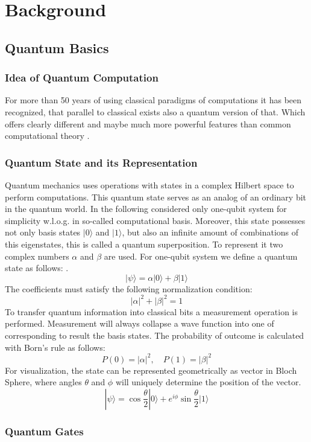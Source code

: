 
\chapter{Background}\label{chapter:background}
\section{Quantum Basics}
\subsection{Idea of Quantum Computation}
For more than 50 years of using classical paradigms of computations it has been recognized, 
that parallel to classical exists also a quantum version of that.
Which offers clearly different and maybe much more powerful features than common computational theory
\parencite{Barenco_1995}.

\subsection{Quantum State and its Representation}
Quantum mechanics uses operations with states in a complex Hilbert space to perform computations.
This quantum state serves as an analog of an ordinary bit in the quantum world.
In the following considered only one-qubit system for simplicity w.l.o.g. in so-called computational basis.
Moreover, this state possesses not only basis states \(|0\rangle\) and \(|1\rangle\),
but also an infinite amount of combinations of this eigenstates, this is called a quantum superposition. 
To represent it two complex numbers \(\alpha\) and \(\beta\) are used.
For one-qubit system we define a quantum state as follows:
\parencite{nielsen00}.
\[
|\psi\rangle = \alpha|0\rangle + \beta|1\rangle
\]
The coefficients must satisfy the following normalization condition:
\[
|\alpha|^2 + |\beta|^2 = 1
\]
To transfer quantum information into classical bits a measurement operation is performed.
Measurement will always collapse a wave function into one of corresponding to result the basis states. 
The probability of outcome is calculated with Born's rule as follows:
\[
P(0) = |\alpha|^2, \quad P(1) = |\beta|^2
\]
For visualization, the state can be represented geometrically as vector in Bloch Sphere, 
where angles \(\theta\) and \(\phi\) will uniquely determine the position of the vector. 
\[
|\psi\rangle = \cos\frac{\theta}{2}|0\rangle + e^{i\phi}\sin\frac{\theta}{2}|1\rangle
\]



\subsection{Quantum Gates}
